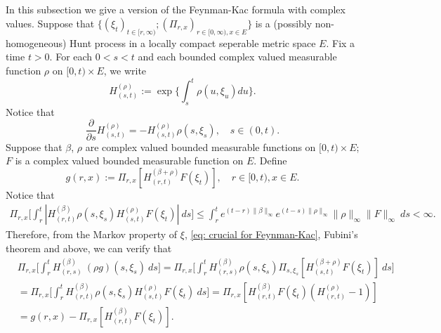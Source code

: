 \documentclass[12pt,oneside,english]{amsart}
\theoremstyle{plain}
\theoremstyle{definition}
\numberwithin{equation}{section}
\begin{document}
\subsection{}
\label{seq: complex Feynman-Kac transform}
    In this subsection we give a version of the Feynman-Kac formula with complex values.
    Suppose that $\{(\xi_t)_{t \in [r,\infty)}; (\Pi_{r,x})_{r\in [0,\infty), x\in E}\}$ is a (possibly non-homogeneous) Hunt process in a locally compact seperable metric space $E$.
    Fix a time $t >0$.
    For each $0< s< t$ and each bounded complex valued measurable function $\rho$ on $[0,t) \times E$, we write
\begin{equation}
    H^{(\rho)}_{(s,t)}:= \exp\Big\{\int_s^t \rho(u,\xi_u) du\Big\}.
\end{equation}
    Notice that
\begin{equation}
\label{eq: crucial for Feynman-Kac}
    \frac{\partial}{\partial s} H^{(\rho)}_{(s,t)}= -H^{(\rho)}_{(s,t)}\rho(s,\xi_s),
    \quad s\in (0,t).
\end{equation}
    Suppose that $\beta$, $\rho$ are complex valued bounded measurable functions on $[0,t) \times E$; $F$ is a complex valued bounded measurable function on $E$.
    Define
\begin{equation}
    g(r,x) := \Pi_{r,x}[ H_{(r,t)}^{(\beta+\rho)} F(\xi_t)],\quad r \in [0,t), x\in E.
\end{equation}
    Notice that
\begin{align}
    \Pi_{r,x} \Big[ \int_r^t | H_{(r,t)}^{(\beta)}\rho(s,\xi_s) H_{(s,t)}^{(\rho)} F(\xi_t)| ~ds \Big]
    \leq  \int_r^t e^{(t-r)\|\beta\|_\infty}e^{(t-s)\|\rho\|_\infty}\|\rho\|_\infty\|F\|_\infty ~ds
    < \infty.
\end{align}
    Therefore, from the Markov property of $\xi$, \eqref{eq: crucial for Feynman-Kac}, Fubini's theorem and above, we can verify that
\begin{align}
    &\Pi_{r,x} \Big[ \int_r^tH_{(r,s)}^{(\beta)}~(\rho g)(s,\xi_s)~ds \Big]
    =\Pi_{r,x} \Big[ \int_r^t H_{(r,s)}^{(\beta)}\rho(s,\xi_s) \Pi_{s,\xi_s}[ H_{(s,t)}^{(\beta+\rho)} F(\xi_t)]~ds \Big]
    \\&= \Pi_{r,x} \Big[ \int_r^t H_{(r,t)}^{(\beta)}\rho(s,\xi_s) H_{(s,t)}^{(\rho)} F(\xi_t) ~ds \Big]
    = \Pi_{r,x} [ H_{(r,t)}^{(\beta)}F(\xi_t)(H_{(r,t)}^{(\rho)} - 1)]
    \\&= g(r,x) - \Pi_{r,x} [ H_{(r,t)}^{(\beta)} F(\xi_t)].
\end{align}
\end{document}
